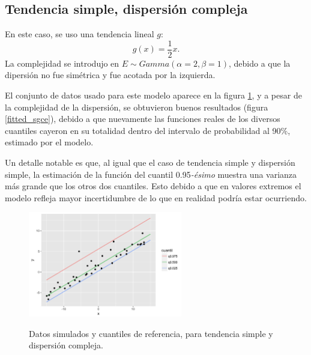 \subsection{Tendencia simple, dispersi\'on compleja}

En este caso, se uso una tendencia lineal $g$:
\begin{equation*}
    g(x) = \frac{1}{2} x.
\end{equation*}
La complejidad se introdujo en $E \sim \textit{Gamma}(\alpha = 2,\beta = 1)$, debido a que la dipersi\'on no fue sim\'etrica y fue acotada por la izquierda. 

El conjunto de datos usado para este modelo aparece en la figura \ref{sample_sgce}, y a pesar de la complejidad de la dispersi\'on, se obtuvieron buenos resultados (figura \ref{fitted_sgce}), debido a que nuevamente las funciones reales de los diversos cuantiles cayeron en su totalidad dentro del intervalo de probabilidad al 90\%, estimado por el modelo.

Un detalle notable es que, al igual que el caso de tendencia simple y dispersi\'on simple, la estimaci\'on de la funci\'on del cuantil 0.95\textit{-\'esimo} muestra una varianza m\'as grande que los otros dos cuantiles. Esto debido a que en valores extremos el modelo refleja mayor incertidumbre de lo que en realidad podr\'ia estar ocurriendo.

\begin{figure}[H]
	\centering
	\caption{Datos simulados y cuantiles de referencia, para tendencia simple y dispersi\'on compleja.}
	\includegraphics[width=0.60\textwidth]{Figures/Simulation/simple_g_complex_error/sample.png}
	\label{sample_sgce}
\end{figure}

